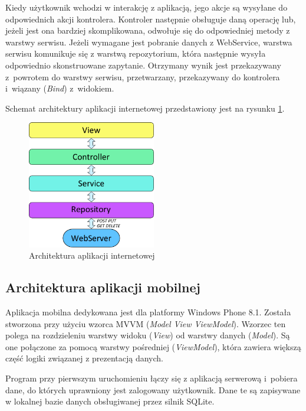 \documentclass[a4paper]{book}
\begin{document}
			Kiedy użytkownik wchodzi w interakcję z aplikacją, jego akcje są wysyłane do odpowiednich akcji kontrolera. Kontroler następnie obsługuje daną operację lub, jeżeli jest ona bardziej skomplikowana, odwołuje się do odpowiedniej metody z warstwy serwisu. Jeżeli wymagane jest pobranie danych z WebService, warstwa serwisu komunikuje się z warstwą repozytorium, która następnie wysyła odpowiednio skonstruowane zapytanie. Otrzymany wynik jest przekazywany z~powrotem do warstwy serwisu, przetwarzany, przekazywany do kontrolera i~wiązany (\emph{Bind}) z~widokiem.								

			Schemat architektury aplikacji internetowej przedstawiony jest na rysunku \ref{fig:architektura_webapp}.	
			
			\begin{figure}
							\centering
							\includegraphics[width=0.5\textwidth]{images/architektura_webapp.pdf}
							\caption{Architektura aplikacji internetowej}
							\label{fig:architektura_webapp}
    		\end{figure}		
			
			\subsection{Architektura aplikacji mobilnej}
			\label{sec:ArchitekturaAplikacjiMobilnej}	
			
			
			Aplikacja mobilna dedykowana jest dla platformy Windows Phone 8.1. Została stworzona przy użyciu wzorca MVVM (\emph{Model View ViewModel}). Wzorzec ten polega na rozdzieleniu warstwy widoku (\emph{View}) od warstwy danych (\emph{Model}). Są one połączone za pomocą warstwy pośredniej (\emph{ViewModel}), która zawiera większą część logiki związanej z prezentacją danych. 
			
			Program przy pierwszym uruchomieniu łączy się z aplikacją serwerową i~pobiera dane, do których uprawniony jest zalogowany użytkownik. Dane te są zapisywane w lokalnej bazie danych obsługiwanej przez silnik SQLite. 
			
\end{document}
